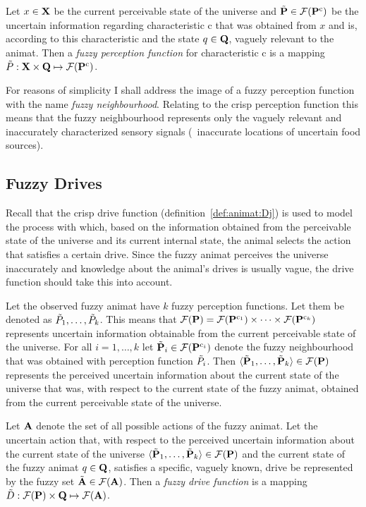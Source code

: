 \begin{defn}
\label{def:fuzzyAnimat:Pi}
Let $x \in {\ensuremath{\mathbf{X}}}$ be the current perceivable state of the universe and ${\tilde{{\mathbf{P}}}} \in {\ensuremath{\mathcal{F}({\mathbf{P}}^\mathrm{c})}}$ be the uncertain information regarding characteristic $\mathrm{c}$ that was obtained from $x$ and is, according to this characteristic and the state $q \in {\ensuremath{\mathbf{Q}}}$, vaguely relevant to the animat. Then a \emph{fuzzy perception function} for characteristic $\mathrm{c}$ is a mapping ${\tilde{P}}: {\mathbf{X}} \times {\ensuremath{\mathbf{Q}}} \mapsto {\ensuremath{\mathcal{F}({\mathbf{P}}^\mathrm{c})}}$.
\end{defn}

For reasons of simplicity I shall address the image of a fuzzy perception function with the name \emph{fuzzy neighbourhood}. Relating to the crisp perception function this means that the fuzzy neighbourhood represents only the vaguely relevant and inaccurately characterized sensory signals (\eg\ inaccurate locations of uncertain food sources). 

\subsection{Fuzzy Drives}
Recall that the crisp drive function (definition~\ref{def:animat:Dj}) is used to model the process with which, based on the information obtained from the perceivable state of the universe and its current internal state, the animal selects the action that satisfies a certain drive. Since the fuzzy animat perceives the universe inaccurately and knowledge about the animal's drives is usually vague, the drive function should take this into account.

Let the observed fuzzy animat have $k$ fuzzy perception functions. Let them be denoted as ${\tilde{P}}_1,\ldots,{\tilde{P}}_k$. This means that ${\mathcal{F}({\mathbf{P}})}={\mathcal{F}({\mathbf{P}}^{\mathrm{c}_1})} \times \cdots \times {\ensuremath{\mathcal{F}({\mathbf{P}}^{\mathrm{c}_k})}}$ represents uncertain information obtainable from the current perceivable state of the universe. For all $i=1,\ldots,k$ let ${\tilde{{\mathbf{P}}}}_i \in {\ensuremath{\mathcal{F}({\mathbf{P}}^{\mathrm{c}_i})}}$ denote the fuzzy neighbourhood that was obtained with perception function ${\tilde{P}}_i$. Then $\langle {\ensuremath{\tilde{{\mathbf{P}}}}}_1,\ldots,{\tilde{{\mathbf{P}}}}_k \rangle \in {\ensuremath{\mathcal{F}({\mathbf{P}})}}$ represents the perceived uncertain information about the current state of the universe that was, with respect to the current state of the fuzzy animat, obtained from the current perceivable state of the universe.

\begin{defn}
\label{def:fuzzyAnimat:Dj}
Let ${\mathbf{A}}$ denote the set of all possible actions of the fuzzy animat. Let the uncertain action that, with respect to the perceived uncertain information about the current state of the universe $\langle {\ensuremath{\tilde{{\mathbf{P}}}}}_1,\ldots,{\tilde{{\mathbf{P}}}}_k \rangle \in {\ensuremath{\mathcal{F}({\mathbf{P}})}}$ and the current state of the fuzzy animat $q \in {\ensuremath{\mathbf{Q}}}$, satisfies a specific, vaguely known, drive be represented by the fuzzy set ${\tilde{{\mathbf{A}}}} \in {\ensuremath{\mathcal{F}({\mathbf{A}})}}$. Then a \emph{fuzzy drive function} is a mapping ${\tilde{D}}: {\mathcal{F}({\mathbf{P}})} \times {\ensuremath{\mathbf{Q}}} \mapsto {\ensuremath{\mathcal{F}({\mathbf{A}})}}$.
\end{defn}

